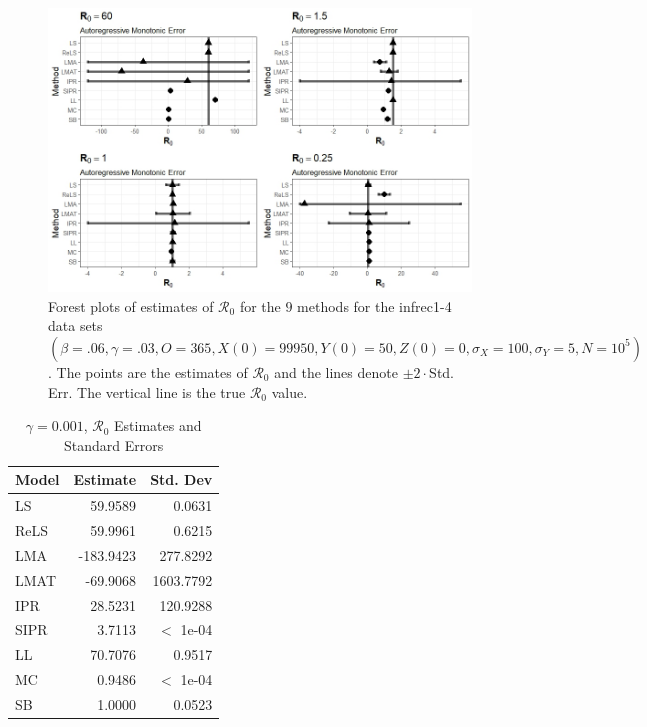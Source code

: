 \documentclass[12pt]{article}
\newcommand{\xxsir}{\ensuremath{9} } %
\newcommand{\rr}{\ensuremath{\mathcal{R}_0}}
\begin{document}
\begin{figure}[H]
	\centering
	\includegraphics[scale=0.5]{images/parchange_arm.jpeg}
	\caption{Forest plots of estimates of $\rr$ for the \xxsir methods for the infrec1-4 data sets $(\beta=.06, \gamma=.03, O=365, X(0)=99950, Y(0)=50, Z(0)=0, \sigma_X=100, \sigma_Y=5, N=10^5)$.  The points are the estimates of $\rr$ and the lines denote $\pm 2\cdot $Std. Err.  The vertical line is the true $\rr$ value.}
\end{figure}
\begin{table}[H]
	
	\centering
	\begin{tabular}[t]{l|r|r}
		\hline
		Model & Estimate & Std. Dev\\
		\hline
		LS & 59.9589 & 0.0631\\
		\hline
		ReLS & 59.9961 & 0.6215\\
		\hline
		LMA & -183.9423 & 277.8292\\
		\hline
		LMAT & -69.9068 & 1603.7792\\
		\hline
		IPR & 28.5231 & 120.9288\\
		\hline
		SIPR & 3.7113 & $<$ 1e-04\\
		\hline
		LL & 70.7076 & 0.9517\\
		\hline
		MC & 0.9486 & $<$ 1e-04\\
		\hline
		SB & 1.0000 & 0.0523\\
		\hline
	\end{tabular}
	\caption{$\gamma = 0.001$, $\rr$ Estimates and Standard Errors}
\end{table}
\end{document}

